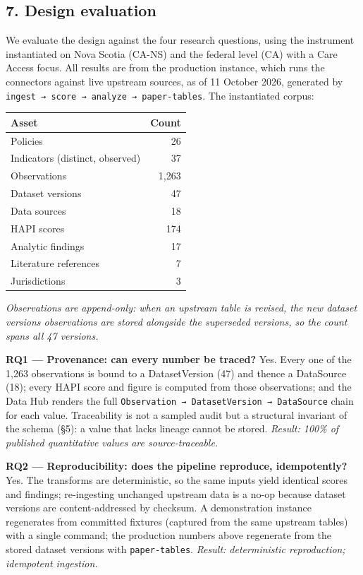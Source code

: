 \documentclass[
  11pt,
]{article}
\begin{document}
\hypertarget{7-design-evaluation}{%
\subsection{7. Design evaluation}\label{7-design-evaluation}}

We evaluate the design against the four research questions, using the
instrument instantiated on Nova Scotia (CA-NS) and the federal level
(CA) with a Care Access focus. All results are from the production
instance, which runs the connectors against live upstream sources, as of
11 October 2026, generated by
\texttt{ingest\ →\ score\ →\ analyze\ →\ paper-tables}. The instantiated
corpus:

\begin{longtable}[]{@{}lr@{}}
\toprule\noalign{}
Asset & Count \\
\midrule\noalign{}
\endhead
\bottomrule\noalign{}
\endlastfoot
Policies & 26 \\
Indicators (distinct, observed) & 37 \\
Observations & 1,263 \\
Dataset versions & 47 \\
Data sources & 18 \\
HAPI scores & 174 \\
Analytic findings & 17 \\
Literature references & 7 \\
Jurisdictions & 3 \\
\end{longtable}

\emph{Observations are append-only: when an upstream table is revised,
the new dataset version\textquotesingle s observations are stored
alongside the superseded version\textquotesingle s, so the count spans
all 47 versions.}

\textbf{RQ1 --- Provenance: can every number be traced?} Yes. Every one
of the 1,263 observations is bound to a DatasetVersion (47) and thence a
DataSource (18); every HAPI score and figure is computed from those
observations; and the Data Hub renders the full
\texttt{Observation\ →\ DatasetVersion\ →\ DataSource} chain for each
value. Traceability is not a sampled audit but a structural invariant of
the schema (§5): a value that lacks lineage cannot be stored.
\emph{Result: 100\% of published quantitative values are
source-traceable.}

\textbf{RQ2 --- Reproducibility: does the pipeline reproduce,
idempotently?} Yes. The transforms are deterministic, so the same inputs
yield identical scores and findings; re-ingesting unchanged upstream
data is a no-op because dataset versions are content-addressed by
checksum. A demonstration instance regenerates from committed fixtures
(captured from the same upstream tables) with a single command; the
production numbers above regenerate from the stored dataset versions
with \texttt{paper-tables}. \emph{Result: deterministic reproduction;
idempotent ingestion.}
\end{document}
